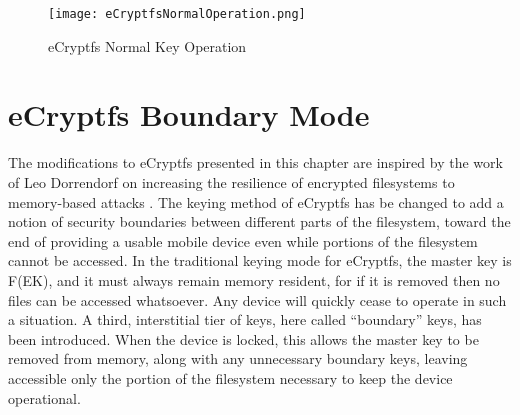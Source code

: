 \begin{figure}[ht] \begin{center}
\texttt{[image: eCryptfsNormalOperation.png]} \end{center}
\caption{eCryptfs Normal Key Operation} \label{fig:ecryptfsnormal} \end{figure}
\section{eCryptfs Boundary Mode}

The modifications to eCryptfs presented in this chapter are inspired by the work of Leo Dorrendorf on increasing the resilience of
encrypted filesystems to memory-based attacks \cite{Dorrendorf2011}. The keying method of eCryptfs has be changed to add a
notion of security boundaries between different parts of the filesystem, toward the end of providing a usable mobile device even
while portions of the filesystem cannot be accessed. In the traditional keying mode for eCryptfs, the master key is
F(EK), and it must always remain memory resident, for if it is removed then no files can be accessed whatsoever.
Any device will quickly cease to operate in such a situation. A third, interstitial tier of keys, here called ``boundary'' keys, has
been introduced. When the device is locked, this allows the master key to be removed from memory, along with any unnecessary
boundary keys, leaving accessible only the portion of the filesystem necessary to keep the device operational.

